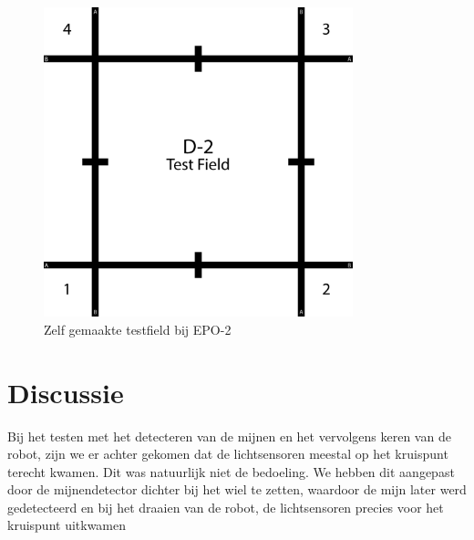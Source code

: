 \documentclass{report}
\begin{document}
\begin{figure}[H]
	\centering
	\includegraphics[width=0.8\textwidth]{d-2_test_field.png}
	\caption{Zelf gemaakte testfield  bij EPO-2}
	\label{fig:testfield}
\end{figure}

\section{Discussie}
Bij het testen met het detecteren van de mijnen en het vervolgens keren van de robot, zijn we er achter gekomen dat de lichtsensoren meestal op het kruispunt terecht kwamen. Dit was natuurlijk niet de bedoeling. We hebben dit aangepast door de mijnendetector dichter bij het wiel te zetten, waardoor de mijn later werd gedetecteerd en bij het draaien van de robot, de lichtsensoren precies voor het kruispunt uitkwamen
\end{document}
